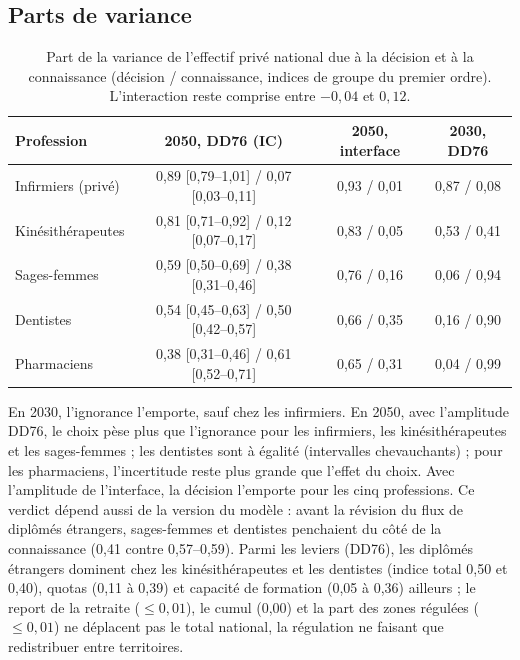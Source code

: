 \documentclass[11pt]{article}
\begin{document}
\subsection{Parts de variance}
\begin{table}[h]\centering\small
\begin{tabular}{lccc}
\toprule
Profession & 2050, DD76 (IC) & 2050, interface & 2030, DD76 \\
\midrule
Infirmiers (privé) & 0,89 [0,79--1,01] / 0,07 [0,03--0,11]\mesure{} & 0,93 / 0,01\mesure{} & 0,87 / 0,08\mesure{} \\
Kinésithérapeutes & 0,81 [0,71--0,92] / 0,12 [0,07--0,17]\mesure{} & 0,83 / 0,05\mesure{} & 0,53 / 0,41\mesure{} \\
Sages-femmes & 0,59 [0,50--0,69] / 0,38 [0,31--0,46]\mesure{} & 0,76 / 0,16\mesure{} & 0,06 / 0,94\mesure{} \\
Dentistes & 0,54 [0,45--0,63] / 0,50 [0,42--0,57]\mesure{} & 0,66 / 0,35\mesure{} & 0,16 / 0,90\mesure{} \\
Pharmaciens & 0,38 [0,31--0,46] / 0,61 [0,52--0,71]\mesure{} & 0,65 / 0,31\mesure{} & 0,04 / 0,99\mesure{} \\
\bottomrule
\end{tabular}
\caption{Part de la variance de l'effectif privé national due à la décision et à la connaissance (décision / connaissance, indices de groupe
du premier ordre). L'interaction reste comprise entre $-0{,}04$ et $0{,}12$\mesure{}.}\label{tab:groupes}
\end{table}

En 2030, l'ignorance l'emporte, sauf chez les infirmiers. En 2050, avec l'amplitude DD76, le choix pèse plus que
l'ignorance pour les infirmiers, les kinésithérapeutes et les sages-femmes ; les dentistes sont à égalité
(intervalles chevauchants) ; pour les pharmaciens, l'incertitude reste plus grande que l'effet du choix. Avec
l'amplitude de l'interface, la décision l'emporte pour les cinq professions. Ce verdict dépend aussi de la version du
modèle : avant la révision du flux de diplômés étrangers, sages-femmes et dentistes penchaient du côté de la
connaissance (0,41 contre 0,57--0,59\mesure{}). Parmi les leviers (DD76), les diplômés étrangers dominent chez les
kinésithérapeutes et les dentistes (indice total 0,50 et 0,40\mesure{}), quotas (0,11 à 0,39\mesure{}) et capacité de
formation (0,05 à 0,36\mesure{}) ailleurs ; le report de la retraite ($\le 0{,}01$), le cumul (0,00) et la part des
zones régulées ($\le 0{,}01$\mesure{}) ne déplacent pas le total national, la régulation ne faisant que redistribuer
entre territoires.
\end{document}
